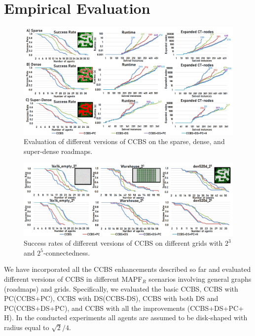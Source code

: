 \documentclass[letterpaper]{article} %
\newcommand{\ccbs}{\ac{CCBS}\xspace}
\newcommand{\ccbsds}{\ac{CCBS-DS}\xspace}
\newcommand{\mapfr}{{MAPF}$_R$\xspace}
\newcommand{\pc}{\ac{PC}\xspace}
\newcommand{\ds}{\ac{DS}\xspace}
\begin{document}

\section{Empirical Evaluation}

\begin{figure}[t]
    \centering
    \includegraphics[width=\textwidth]{Roadmaps_results.png}
    \caption{Evaluation of different versions of CCBS on the sparse, dense, and super-dense roadmaps.}
    \label{figRoadmapsResults}
\end{figure}

\begin{figure}[t]
    \centering
    \includegraphics[width=\textwidth]{Grids_SR_all.png}
    \caption{Success rates of different versions of CCBS on different grids with $2^3$ and $2^5$-connectedness.}
    \label{figGridsResults}
\end{figure}

We have incorporated all the \ccbs enhancements described so far and evaluated different versions of \ccbs in different \mapfr scenarios involving general graphs (roadmaps) and grids. 
Specifically, we evaluated the basic \ccbs, \ccbs with \pc (\ccbs+\pc), \ccbs with \ds (\ccbsds), 
\ccbs with both \ds and \pc (\ccbs+\ds+\pc), 
and \ccbs with all the improvements (\ccbs+\ds+\pc + H). 
In the conducted experiments all agents are assumed to be disk-shaped with radius equal to $\sqrt{2}/4$. 
\end{document}
